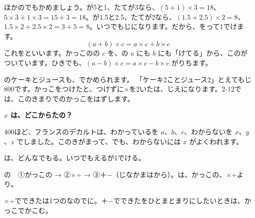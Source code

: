 \vspace{3pt}
ほかのでもかめましょう。が5と1、たてが3なら、$(5+1)\times3=18$、$5\times3+1\times3=15+3=18$。が1.5と2.5、たてが2なら、$(1.5+2.5)\times2=8$、$1.5\times2+2.5\times2=3+5=8$。いつでもじになります。だから、をって1でけます。
\[ (a+b)\times c=a\times c+b\times c \]
これを\textbf{}といいます。かっこのの $c$ を、の $a$ にも $b$ にも「けてる」から、このがついています。ひきでも、$(a-b)\times c=a\times c-b\times c$ がりちます。

のケーキとジュースも、でかめられます。
「ケーキ2ことジュース2」とえてもじ800です。かっこをつけたと、つけずに×を2いたは、じえになります。2-12では、このきまりでのかっこをはずします。

\begin{motto}[2]
\textbf{$x$ は、どこからたの？}\par
400ほど、フランスのデカルトは、わかっているを $a$、$b$、$c$、わからないを $x$、$y$、$z$ でしました。このきがまって、でも、わからないには $x$ がよくわれます。
\end{motto}

\begin{taisetsu}
は、どんなでもる。いつでもえるが1でける。\par\vspace{3pt}
の　①かっこの → ②×÷ → ③＋−（じなかまはから）。は、かっこの、×÷より。\par\vspace{3pt}
×÷でできたは1つのなのでに。＋−でできたをひとまとまりにしたいときは、かっこでかこむ。
\end{taisetsu}


